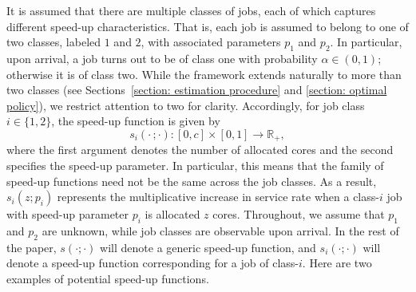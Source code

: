 \documentclass[11pt]{article}
\newcommand{\jp}[1]{\footnote{J-P: #1}}
\theoremstyle{remark}
\theoremstyle{definition}
\numberwithin{equation}{section}
\begin{document}

{It is assumed that there are multiple classes of jobs, each of which captures different speed-up characteristics. That is, each job is assumed to} belong to one of two classes, labeled $1$ and $2$, with associated parameters $p_1$ and $p_2$. In particular, upon arrival, a job turns out to be of class one with probability $\alpha\in(0,1)$; otherwise it is of class two. While the framework extends naturally to more than two classes (see Sections~\ref{section: estimation procedure} and \ref{section: optimal policy}), we restrict attention to two for clarity.
Accordingly, for job class $i \in \{1,2\}$,
the speed-up function is given by
\[
s_i(\cdot\,;\cdot) : [0,c] \times [0,1] \to \mathbb{R}_+,
\]
where the first argument denotes the number of allocated cores and the second specifies the speed-up parameter.
In particular, this means that the family of speed-up functions need not be the same across the job classes.
As a result, $s_i(z;p_i)$ represents the multiplicative increase in service rate when a class-$i$ job with speed-up parameter $p_i$ is allocated $z$ cores. Throughout, we assume that $p_1$ and $p_2$ are unknown, while job classes are observable upon arrival.
In the rest of the paper, $s(\cdot;\cdot)$ will denote a generic speed-up function, and $s_i(\cdot;\cdot)$ will denote a speed-up function corresponding for a job of class-$i$. 
Here are two examples of potential speed-up functions.
\end{document}
